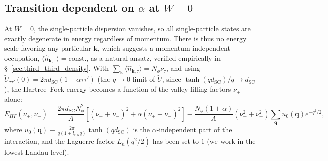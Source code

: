 \subsection{\texorpdfstring{Transition dependent on $\alpha$ at $W=0$}{Transition dependent on alpha at W=0}}\label{subsec:alpha_transition}

At $W=0$, the single-particle dispersion vanishes, so all single-particle states are exactly degenerate in energy regardless of momentum. There is thus no energy scale favoring any particular $\mathbf{k}$, which suggests a momentum-independent occupation, $\langle \hat{n}_{\mathbf{k},\tau}\rangle = \text{const.}$, as a natural ansatz, verified empirically in \S~\ref{sec:third_third_density}. With $\sum_{\mathbf{k}} \langle \hat{n}_{\mathbf{k},\tau}\rangle = N_\phi \nu_\tau$, and using $\tilde{U}_{\tau\tau'}(0) = 2\pi d_{\text{SC}}(1+\alpha\tau\tau')$ (the $q\to0$ limit of $\tilde U$, since $\tanh(qd_{\text{SC}})/q \to d_{\text{SC}}$), the Hartree--Fock energy becomes a function of the valley filling factors $\nu_\pm$ alone: %
\begin{equation}
    E_{HF}(\nu_+, \nu_-) = \frac{2\pi d_{\text{SC}} N_{\phi}^2}{A} \left[ {(\nu_+ + \nu_-)}^2 + \alpha{(\nu_+ - \nu_-)}^2 \right] - \frac{N_{\phi} (1+\alpha)}{A} \left( \nu_+^2 + \nu_-^2 \right) \sum_{\mathbf{q}} u_0(\mathbf{q}) e^{-q^2/2},
    \label{eq:ehf_nu_pm}
\end{equation}
where $u_0(\mathbf{q}) \equiv \frac{2\pi}{q(1+l_{\text{RK}}q)}\tanh(qd_{\text{SC}})$ is the $\alpha$-independent part of the interaction, and the Laguerre factor $L_n(q^2/2)$ has been set to $1$ (we work in the lowest Landau level).

